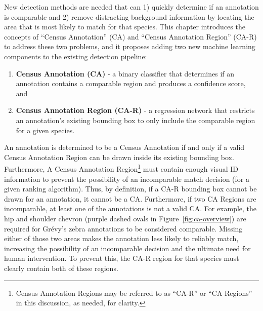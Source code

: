 New detection methods are needed that can 1) quickly determine if an annotation is comparable and 2) remove distracting background information by locating the area that is most likely to match for that species.  This chapter introduces the concepts of ``Census Annotation'' (CA) and ``Census Annotation Region'' (CA-R) to address these two problems, and it proposes adding two new machine learning components to the existing detection pipeline:

\begin{enumerate}
    \item \textbf{Census Annotation (CA)} - a binary classifier that determines if an annotation contains a comparable region and produces a confidence score, and
    \item \textbf{Census Annotation Region (CA-R)} - a regression network that restricts an annotation's existing bounding box to only include the comparable region for a given species.
\end{enumerate}

\noindent An annotation is determined to be a Census Annotation if and only if a valid Census Annotation Region can be drawn inside its existing bounding box.  Furthermore, A Census Annotation Region\footnote{Census Annotation Regions may be referred to as ``CA-R'' or ``CA Regions'' in this discussion, as needed, for clarity.} must contain enough visual ID information to prevent the possibility of an incomparable match decision (for a given ranking algorithm). Thus, by definition, if a CA-R bounding box cannot be drawn for an annotation, it cannot be a CA.  Furthermore, if two CA Regions are incomparable, at least one of the annotations is not a valid CA.  For example, the hip and shoulder chevron (purple dashed ovals in Figure~\ref{fig:ca-overview}) are required for Gr\'evy's zebra annotations to be considered comparable. Missing either of those two areas makes the annotation less likely to reliably match, increasing the possibility of an incomparable decision and the ultimate need for human intervention.  To prevent this, the CA-R region for that species must clearly contain both of these regions.

